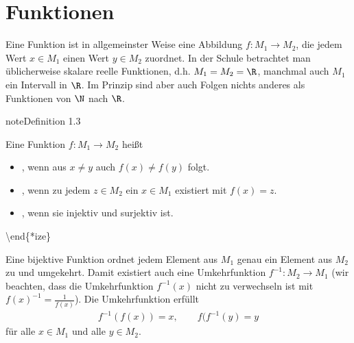 \documentclass[letterpaper,10pt,english]{jupyterBook}
\begin{document}
\section{Funktionen}
\label{\detokenize{vorkurs/funktionen:funktionen}}\label{\detokenize{vorkurs/funktionen::doc}}
Eine Funktion ist in allgemeinster Weise eine Abbildung \(f: M_1 \rightarrow M_2\), die jedem Wert \(x \in M_1\) einen  Wert \(y \in M_2\) zuordnet. In der Schule betrachtet man üblicherweise skalare reelle Funktionen, d.h. \(M_1=M_2=\R\), manchmal auch \(M_1\) ein Intervall in \(\R\). Im Prinzip sind aber auch Folgen nichts anderes als Funktionen von \(\N\) nach \(\R\).
\label{vorkurs/funktionen:definition-0}
\begin{sphinxadmonition}{note}{Definition 1.3}



Eine Funktion \(f:M_1 \rightarrow M_2\) heißt
\begin{itemize}
\item {} 
, wenn aus \(x \neq y\) auch \(f(x) \neq f(y)\) folgt.

\item {} 
, wenn zu jedem \(z \in M_2\) ein \(x \in M_1\) existiert mit \(f(x)=z\).

\item {} 
, wenn sie injektiv und surjektiv ist.

\end{itemize}

\textbackslash{}end\{*ize\}
\end{sphinxadmonition}

Eine bijektive Funktion ordnet jedem Element aus \(M_1\) genau ein Element aus \(M_2\) zu und umgekehrt. Damit existiert  auch eine Umkehrfunktion \(f^{-1}: M_2 \rightarrow M_1\) (wir beachten, dass die Umkehrfunktion \(f^{-1}(x)\) nicht zu verwechseln ist mit \(f(x)^{-1} = \frac{1}{f(x)}\)). Die Umkehrfunktion erfüllt
\begin{equation*}
\begin{split} f^{-1}(f(x)) = x, \qquad f(f^{-1}(y) = y \end{split}
\end{equation*}
für alle \(x \in M_1\) und alle \(y \in M_2\).
\end{document}
